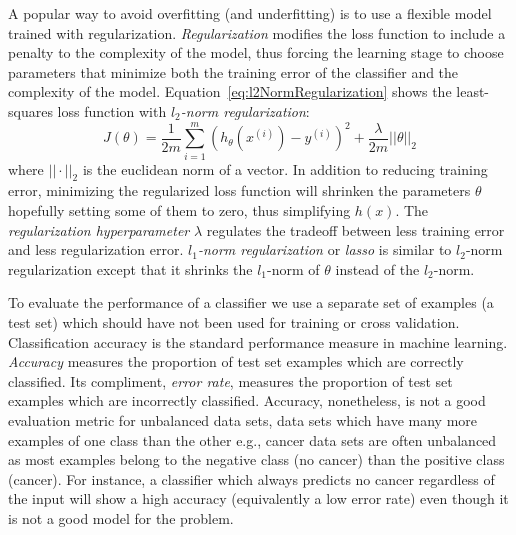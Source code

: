A popular way to avoid overfitting (and underfitting) is to use a flexible model trained with regularization. \emph{Regularization} modifies the loss function to include a penalty to the complexity of the model, thus forcing the learning stage to choose parameters that minimize both the training error of the classifier and the complexity of the model. Equation~\ref{eq:l2NormRegularization} shows the least-squares loss function with \emph{$l_2$-norm regularization}:
\begin{equation}
	J(\theta) =  \frac{1}{2m}\sum_{i=1}^m(h_\theta(x^{(i)}) - y^{(i)})^2 + \frac{\lambda}{2m} ||\theta||_2
	\label{eq:l2NormRegularization}
\end{equation}
where $||\cdot||_2$ is the euclidean norm of a vector. In addition to reducing training error, minimizing the regularized loss function will shrinken the parameters $\theta$ hopefully setting some of them to zero, thus simplifying $h(x)$. The \emph{regularization hyperparameter} $\lambda$ regulates the tradeoff between less training error and less regularization error. \emph{$l_1$-norm regularization} or \emph{lasso} is similar to $l_2$-norm regularization except that it shrinks the $l_1$-norm of $\theta$ instead of the $l_2$-norm.

To evaluate the performance of a classifier we use a separate set of examples (a test set) which should have not been used for training or cross validation. Classification accuracy is the standard performance measure in machine learning. \emph{Accuracy} measures the proportion of test set examples which are correctly classified. Its compliment, \emph{error rate}, measures the proportion of test set examples which are incorrectly classified. Accuracy, nonetheless, is not a good evaluation metric for unbalanced data sets, data sets which have many more examples of one class than the other e.g., cancer data sets are often unbalanced as most examples belong to the negative class (no cancer) than the positive class (cancer). For instance, a classifier which always predicts no cancer regardless of the input will show a high accuracy (equivalently a low error rate) even though it is not a good model for the problem.

